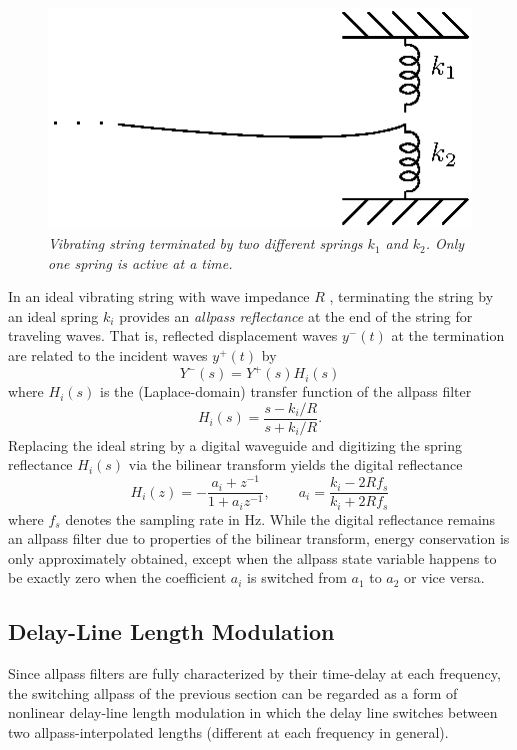 \documentclass[twoside,a4paper]{article}
\newcommand{\zi}{z^{-1}}
\begin{document}
\begin{figure}[ht]
\centerline{\includegraphics[scale=0.8]{eps/stringk1k2.eps}}
\caption{\label{stringk1k2}{\it Vibrating string terminated by two
    different springs $k_1$ and $k_2$. Only one spring is active at a
    time.}}
\end{figure}

In an ideal vibrating string with wave impedance $R$ \cite{PASP},
terminating the string by an ideal spring $k_i$ provides an
\emph{allpass reflectance} at the end of the string for traveling
waves.  That is, reflected displacement waves $y^-(t)$ at the
termination are related to the incident waves $y^+(t)$ by
\[
Y^-(s) = Y^+(s) H_i(s) 
\]
where $H_i(s)$ is the (Laplace-domain) transfer function of the allpass filter
\[
H_i(s) = \frac{s-k_i/R}{s+k_i/R}.
\]
Replacing the ideal string by a digital waveguide \cite{PASP} and 
digitizing the spring reflectance $H_i(s)$ via the bilinear transform
yields the digital reflectance
\[
H_i(z) = -\frac{a_i+\zi}{1+a_i\zi},\qquad a_i=\frac{k_i-2Rf_s}{k_i+2Rf_s}
\]
where $f_s$ denotes the sampling rate in Hz.  While the digital
reflectance remains an allpass filter due to properties of the
bilinear transform, energy conservation is only
approximately obtained, except when the allpass state variable happens
to be exactly zero when the coefficient $a_i$ is switched from $a_1$ to
$a_2$ or vice versa.

\subsection{Delay-Line Length Modulation}

Since allpass filters are fully characterized by their time-delay at
each frequency, the switching allpass of the previous section can be
regarded as a form of nonlinear delay-line length modulation in which
the delay line switches between two allpass-interpolated lengths
(different at each frequency in general).
\end{document}
